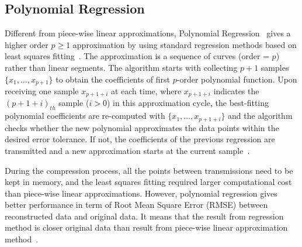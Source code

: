 \subsection{Polynomial Regression}
\label{sec:polynomial}

Different from piece-wise linear approximations, Polynomial
Regression~\cite{zordan2014performance} gives a higher order $p \geqslant1$
approximation by using standard regression methods based on least squares
fitting~\cite{phillips2003interpolation}. The approximation is a sequence of
curves (order = $p$) rather than linear segments. The algorithm starts with
collecting $p+1$ samples $\{x_1, ..., x_{p+1} \}$ to obtain the coefficients of
first $p$-order polynomial function. Upon receiving one sample $x_{p+1+i}$ at
each time, where $x_{p+1+i}$ indicates the $(p+1+i)_{th}$ sample ($i>0$) in this
approximation cycle, the best-fitting polynomial coefficients are re-computed
with $\{ x_1, ..., x_{p+1+i}\}$ and the algorithm checks whether the new
polynomial approximates the data points within the desired error tolerance. If
not, the coefficients of the previous regression are transmitted and a new
approximation starts at the current sample~\cite{zordan2014performance}. 

During the compression process, all the points between transmissions need to be
kept in memory, and the least squares fitting required larger computational cost
than piece-wise linear approximations. However, polynomial regression gives
better performance in term of Root Mean Square Error (RMSE) between
reconstructed data and original data. It means that the result from regression
method is closer original data than result from piece-wise linear approximation
method~\cite{zordan2014performance}.



